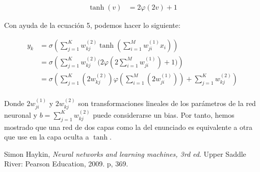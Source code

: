 \documentclass[11pt,spanish,answers]{exam}
\begin{document}
\begin{questions}
\begin{solution}
    \begin{equation} \label{eq5}
        \begin{split}
           \tanh(v) &= 2\varphi(2v) + 1
        \end{split}
    \end{equation}
    
    Con ayuda de la ecuación 5, podemos hacer lo siguiente:
    
    \begin{align*}
        y_k &= \sigma(\sum_{j=1}^{K} w_{kj}^{(2)} \tanh(\sum_{i=1}^{M} w_{ji}^{(1)} x_i)) \tag*{(Enunciado)} \\
        &= \sigma(\sum_{j=1}^{K} w_{kj}^{(2)} \Big( 2\varphi(2\sum_{i=1}^{M} w_{ji}^{(1)})+1 \Big)) \tag*{(Ecuación 5)} \\
        &= \sigma(\sum_{j=1}^{K} (2w_{kj}^{(2)}) \varphi(\sum_{i=1}^{M} (2w_{ji}^{(1)})) + \sum_{j=1}^{K} w_{kj}^{(2)}) \tag*{(Distribuyendo)} \\
    \end{align*}
    
    Donde $2w_{ji}^{(1)}$ y $2w_{kj}^{(2)}$ son transformaciones lineales de los parámetros de la red neuronal y $b = \sum_{j=1}^{K} w_{kj}^{(2)}$ puede considerarse un bias. Por tanto, hemos mostrado que una red de dos capas como la del enunciado es equivalente a otra que use en la capa oculta a $\tanh$.
    
\end{solution}

\end{questions}



\begin{thebibliography}{1}
Simon Haykin,
\textit{Neural networks and learning machines, 3rd ed}. 
Upper Saddle River: Pearson Education, 2009. p, 369.
\end{thebibliography}
\end{document}
